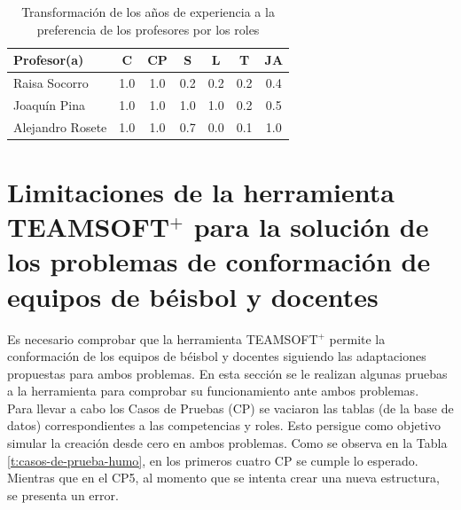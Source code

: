 \begin{table}[H]
	\centering
	\caption{Transformación de los años de experiencia a la preferencia de los profesores por los roles}\label{trans-prof}
	\hspace{-2cm}
	\begin{tabular}{l c c c c c c}
		\toprule[1.7pt]
		Profesor(a) & C   & CP  & S   & L   & T   & JA  \\ \midrule
		Raisa Socorro                             & 1.0 & 1.0 & 0.2 & 0.2 & 0.2 & 0.4 \\
		\rowcolor{gray!30} Joaquín Pina                              & 1.0 & 1.0 & 1.0 & 1.0 & 0.2 & 0.5 \\
		Alejandro Rosete                          & 1.0 & 1.0 & 0.7 & 0.0 & 0.1 & 1.0 \\
		\bottomrule[1pt]          
	\end{tabular}
\end{table}

\section{Limitaciones de la herramienta TEAMSOFT$^+$ para la solución de los problemas de conformación de equipos de béisbol y docentes} \label{sec:limitaciones}

Es necesario comprobar que la herramienta TEAMSOFT$^+$ permite la conformación de los equipos de béisbol y docentes siguiendo las adaptaciones propuestas para ambos problemas. En esta sección se le realizan algunas pruebas a la herramienta para comprobar su funcionamiento ante ambos problemas. \\

Para llevar a cabo los Casos de Pruebas (CP) se vaciaron las tablas (de la base de datos) correspondientes a las competencias y roles. Esto persigue como objetivo simular la creación desde cero en ambos problemas. Como se observa en la Tabla \ref{t:casos-de-prueba-humo}, en los primeros cuatro CP se cumple lo esperado. Mientras que en el CP5, al momento que se intenta crear una nueva estructura, se presenta un error.

